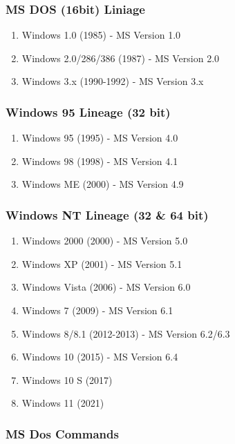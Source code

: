 \subsubsection{MS DOS (16bit) Liniage}

\begin{enumerate}
    \item Windows 1.0 (1985) - MS Version 1.0
    \item Windows 2.0/286/386 (1987) - MS Version 2.0
    \item Windows 3.x (1990-1992) - MS Version 3.x
\end{enumerate}

\subsubsection{Windows 95 Lineage (32 bit)}

\begin{enumerate}
    \item Windows 95 (1995) - MS Version 4.0
    \item Windows 98 (1998) - MS Version 4.1
    \item Windows ME (2000) - MS Version 4.9
\end{enumerate}

\subsubsection{Windows NT Lineage (32 \& 64 bit)}

\begin{enumerate}
    \item Windows 2000 (2000) - MS Version 5.0
    \item Windows XP (2001) - MS Version 5.1
    \item Windows Vista (2006) - MS Version 6.0
    \item Windows 7 (2009) - MS Version 6.1
    \item Windows 8/8.1 (2012-2013) - MS Version 6.2/6.3
    \item Windows 10 (2015) - MS Version 6.4
    \item Windows 10 S (2017)
    \item Windows 11 (2021)
\end{enumerate}

\subsubsection{MS Dos Commands}

